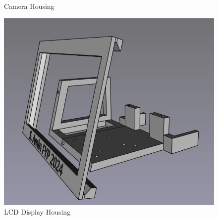 \begin{figure}
\begin{minipage}[t]{0.32\textwidth}
      \caption{Camera Housing}
      \label{fig:camerahousing}
    \end{minipage}
    \hfill
    \begin{minipage}[t]{0.32\textwidth}
      \centering
      \includegraphics[width=\textwidth]{imgs/freecad/lcd_mount.jpg}
      \caption{LCD Display Housing}
    \end{minipage}
\end{figure}

